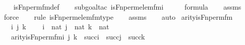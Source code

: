\begin{isabellebody}
%
\isadelimproof
\ \ %
\endisadelimproof
%
\isatagproof
{}\isamarkupfalse%
\ is{\isacharunderscore}{\kern0pt}Fn{\isacharunderscore}{\kern0pt}perm{\isacharprime}{\kern0pt}{\isacharunderscore}{\kern0pt}fm{\isacharunderscore}{\kern0pt}def\ \isanewline
\ \ \isamarkupfalse%
{\isacharparenleft}{\kern0pt}subgoal{\isacharunderscore}{\kern0pt}tac\ {\isachardoublequoteopen}is{\isacharunderscore}{\kern0pt}Fn{\isacharunderscore}{\kern0pt}perm{\isacharprime}{\kern0pt}{\isacharunderscore}{\kern0pt}elem{\isacharunderscore}{\kern0pt}fm{\isacharparenleft}{\kern0pt}i\ {\isacharhash}{\kern0pt}{\isacharplus}{\kern0pt}\ {}{\isacharcomma}{\kern0pt}\ {}{\isacharcomma}{\kern0pt}\ {}{\isacharparenright}{\kern0pt}\ {\isasymin}\ formula{\isachardoublequoteclose}{\isacharparenright}{\kern0pt}\isanewline
\ \ \isamarkupfalse%
\ assms\isanewline
\ \ \ \isamarkupfalse%
\ force\ \isanewline
\ \ \isamarkupfalse%
{\isacharparenleft}{\kern0pt}rule\ is{\isacharunderscore}{\kern0pt}Fn{\isacharunderscore}{\kern0pt}perm{\isacharprime}{\kern0pt}{\isacharunderscore}{\kern0pt}elem{\isacharunderscore}{\kern0pt}fm{\isacharunderscore}{\kern0pt}type{\isacharparenright}{\kern0pt}\isanewline
\ \ \isamarkupfalse%
\ assms\isanewline
\ \ \isamarkupfalse%
\ auto%
\endisatagproof
{\isafoldproof}%
%
\isadelimproof
\isanewline
%
\endisadelimproof
\isanewline
{}\isamarkupfalse%
\ arity{\isacharunderscore}{\kern0pt}is{\isacharunderscore}{\kern0pt}Fn{\isacharunderscore}{\kern0pt}perm{\isacharprime}{\kern0pt}{\isacharunderscore}{\kern0pt}fm\ {\isacharcolon}{\kern0pt}\ \isanewline
\ \ \ i\ j\ k\ \isanewline
\ \ \ {\isachardoublequoteopen}i\ {\isasymin}\ nat{\isachardoublequoteclose}\ {\isachardoublequoteopen}j\ {\isasymin}\ nat{\isachardoublequoteclose}\ {\isachardoublequoteopen}k\ {\isasymin}\ nat{\isachardoublequoteclose}\ \isanewline
\ \ \ {\isachardoublequoteopen}arity{\isacharparenleft}{\kern0pt}is{\isacharunderscore}{\kern0pt}Fn{\isacharunderscore}{\kern0pt}perm{\isacharprime}{\kern0pt}{\isacharunderscore}{\kern0pt}fm{\isacharparenleft}{\kern0pt}i{\isacharcomma}{\kern0pt}\ j{\isacharcomma}{\kern0pt}\ k{\isacharparenright}{\kern0pt}{\isacharparenright}{\kern0pt}\ {\isasymle}\ succ{\isacharparenleft}{\kern0pt}i{\isacharparenright}{\kern0pt}\ {\isasymunion}\ succ{\isacharparenleft}{\kern0pt}j{\isacharparenright}{\kern0pt}\ {\isasymunion}\ succ{\isacharparenleft}{\kern0pt}k{\isacharparenright}{\kern0pt}{\isachardoublequoteclose}\isanewline

\end{isabellebody}
